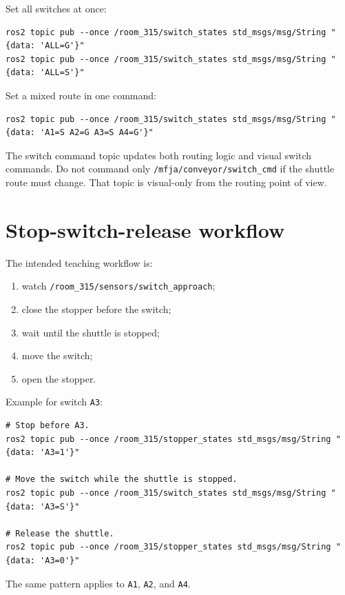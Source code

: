 \documentclass[12pt,a4paper]{report}
\begin{document}
Set all switches at once:

\begin{lstlisting}[style=terminalcode]
ros2 topic pub --once /room_315/switch_states std_msgs/msg/String "{data: 'ALL=G'}"
ros2 topic pub --once /room_315/switch_states std_msgs/msg/String "{data: 'ALL=S'}"
\end{lstlisting}

Set a mixed route in one command:

\begin{lstlisting}[style=terminalcode]
ros2 topic pub --once /room_315/switch_states std_msgs/msg/String "{data: 'A1=S A2=G A3=S A4=G'}"
\end{lstlisting}

The switch command topic updates both routing logic and visual switch commands.
Do not command only \texttt{/mfja/conveyor/switch\_cmd} if the shuttle route
must change. That topic is visual-only from the routing point of view.

\section{Stop-switch-release workflow}

The intended teaching workflow is:

\begin{enumerate}
\item watch \texttt{/room\_315/sensors/switch\_approach};
\item close the stopper before the switch;
\item wait until the shuttle is stopped;
\item move the switch;
\item open the stopper.
\end{enumerate}

Example for switch \texttt{A3}:

\begin{lstlisting}[style=terminalcode]
# Stop before A3.
ros2 topic pub --once /room_315/stopper_states std_msgs/msg/String "{data: 'A3=1'}"

# Move the switch while the shuttle is stopped.
ros2 topic pub --once /room_315/switch_states std_msgs/msg/String "{data: 'A3=S'}"

# Release the shuttle.
ros2 topic pub --once /room_315/stopper_states std_msgs/msg/String "{data: 'A3=0'}"
\end{lstlisting}

The same pattern applies to \texttt{A1}, \texttt{A2}, and \texttt{A4}.
\end{document}
